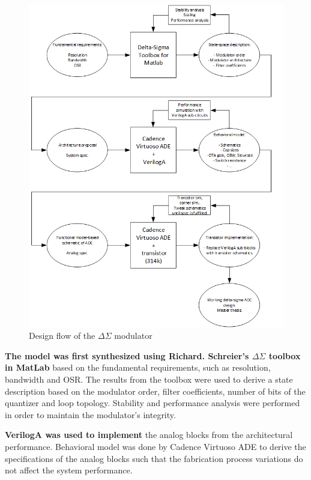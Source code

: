 \begin{figure}[H]
\centering
\includegraphics[scale = 0.6]{images/design_slow.png}
\caption{Design flow of the $\Delta\Sigma$ modulator}
\label{intro_design_flow}
\end{figure}

\textbf{The model was first synthesized using Richard. Schreier’s $\Delta\Sigma$ toolbox in MatLab\cite{tool}} based on the fundamental requirements, such as resolution, bandwidth and OSR. The results from the toolbox were used to derive a state description based on the modulator order, filter coefficients, number of bits of the quantizer and loop topology. Stability and performance analysis were performed in order to maintain the modulator's integrity.

\textbf{VerilogA was used to implement} the analog blocks from the architectural performance. Behavioral model was done by Cadence Virtuoso ADE to derive the specifications of the analog blocks such that the fabrication process variations do not affect the system performance.

